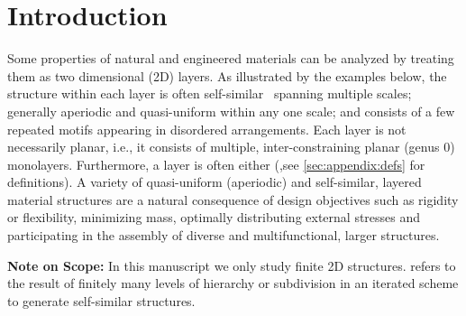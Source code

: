 \section{Introduction}
\label{sec:intro}

\newcommand{\seedefs}{(formally defined in \ref{sec:appendix:defs})}
\newcommand{\seedefsb}{(see \ref{sec:appendix:defs} for definitions)}
\newcommand{\seedefsc}{See \ref{sec:appendix:defs} for formal definitions}
\newcommand{\seedefsd}{see \ref{sec:appendix:defs} for definitions}
\newcommand{\seedefsprelim}{(formally defined in Section \ref{sec:prelim})}


Some properties of natural and engineered materials can be analyzed by treating them as two dimensional (2D) layers. As illustrated by the examples below, the structure within each layer is often self-similar~\cite{2012arXiv1204.6389G} spanning multiple scales; generally aperiodic and quasi-uniform within any one scale; and consists of a few repeated motifs appearing in disordered arrangements. Each layer is not necessarily planar, i.e., it consists of multiple, inter-constraining planar (genus 0) monolayers. Furthermore, a layer is often  either
 (,\seedefsd). A variety of quasi-uniform (aperiodic) and self-similar, layered material structures are a natural consequence of design objectives such as rigidity or flexibility, minimizing mass, optimally distributing external stresses and participating in the assembly of diverse and multifunctional, larger  structures.

\noindent
\textbf{Note on Scope:} In this manuscript we only study finite 2D structures.  refers to the result of finitely many levels of hierarchy or subdivision in an iterated scheme to generate self-similar structures.




\ClearMyMinHeight
{}

